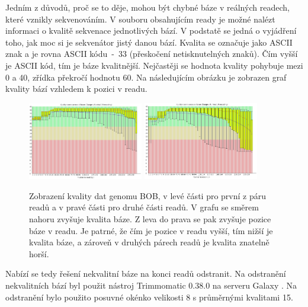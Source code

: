 \documentclass[czech,DP]{thesiskiv}
\numberwithin{equation}{section}
\begin{document}
\noindent
Jedním z důvodů, proč se to děje, mohou být chybné báze v reálných readech, které vznikly sekvenováním. V souboru obsahujícím ready je možné nalézt informaci o kvalitě sekvenace jednotlivých bází. V podstatě se jedná o vyjádření toho, jak moc si je sekvenátor jistý danou bází. Kvalita se označuje jako ASCII znak a je rovna ASCII kódu~-~33 (přeskočení netisknutelných znaků). Čím vyšší je ASCII kód, tím je báze kvalitnější. Nejčastěji se hodnota kvality pohybuje mezi 0 a 40, zřídka překročí hodnotu 60. Na následujícím obrázku je zobrazen graf kvality bází vzhledem k pozici v readu.

\begin{figure}[H]		
		\centering
		\includegraphics[width=190px]{./img/quality_graf_bob_no_trim_r1.png}
		\includegraphics[width=190px]{./img/quality_graf_bob_no_trim_r2.png}
		\caption{Zobrazení kvality dat genomu BOB, v levé části pro první z páru readů a v pravé části pro druhé části readů. V grafu se směrem nahoru zvyšuje kvalita báze. Z leva do prava se pak zvyšuje pozice báze v readu. Je patrné, že čím je pozice v readu vyšší, tím nižší je kvalita báze, a zároveň v druhých párech readů je kvalita znatelně horší.}
		\label{fig:graf_quality_no_trim}
\end{figure}


\noindent
Nabízí se tedy řešení nekvalitní báze na konci readů odstranit. Na odstranění nekvalitních bází byl použit nástroj Trimmomatic 0.38.0 na serveru Galaxy \cite{galaxy}. Na odstranění bylo použito posuvné okénko velikosti 8 s průměrnými kvalitami 15. 
\end{document}
